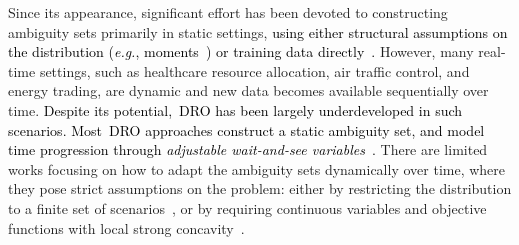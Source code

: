 \documentclass[12pt]{article}
\newcommand{\eg}{{\it e.g.}}
\newcommand{\RC}[1]{\textcolor{black}{#1}}
\newcommand{\RC}[1]{\textcolor{blue}{#1}}
\begin{document}
Since its appearance, significant effort has been devoted to constructing ambiguity sets primarily in static settings, \RC{using either structural assumptions on the distribution (\eg, moments~\cite{moment,moment_1}) or training data directly~\cite{kuhn2019wasserstein,gao2016distributionally}.}
However, many real-time settings, such as healthcare resource allocation, air traffic control, and energy trading, are dynamic and new data becomes available sequentially over time.
\RC{Despite its potential,~\gls{DRO} has been largely underdeveloped in such scenarios.
Most~\gls{DRO} approaches construct a static ambiguity set, and model time progression through {\it adjustable wait-and-see variables}~\cite{adro2,adro,robustadaptopt}.}
There are limited works focusing on how to adapt the ambiguity sets dynamically over time, where they pose strict assumptions on the problem: either by restricting the distribution to a finite set of scenarios~\cite{drotime}, or by requiring continuous variables and objective functions with local strong concavity~\cite{assim}.
\end{document}

